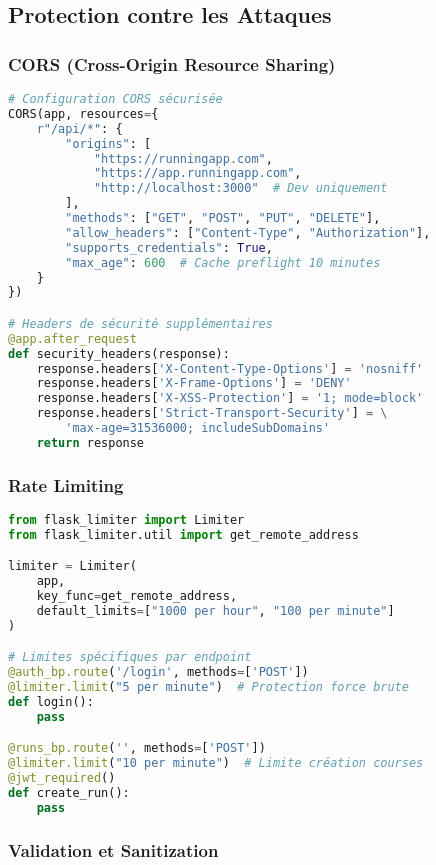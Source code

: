 \subsection{Protection contre les Attaques}

\subsubsection{CORS (Cross-Origin Resource Sharing)}

\begin{lstlisting}[language=python]
# Configuration CORS sécurisée
CORS(app, resources={
    r"/api/*": {
        "origins": [
            "https://runningapp.com",
            "https://app.runningapp.com",
            "http://localhost:3000"  # Dev uniquement
        ],
        "methods": ["GET", "POST", "PUT", "DELETE"],
        "allow_headers": ["Content-Type", "Authorization"],
        "supports_credentials": True,
        "max_age": 600  # Cache preflight 10 minutes
    }
})

# Headers de sécurité supplémentaires
@app.after_request
def security_headers(response):
    response.headers['X-Content-Type-Options'] = 'nosniff'
    response.headers['X-Frame-Options'] = 'DENY'
    response.headers['X-XSS-Protection'] = '1; mode=block'
    response.headers['Strict-Transport-Security'] = \
        'max-age=31536000; includeSubDomains'
    return response
\end{lstlisting}

\subsubsection{Rate Limiting}

\begin{lstlisting}[language=python]
from flask_limiter import Limiter
from flask_limiter.util import get_remote_address

limiter = Limiter(
    app,
    key_func=get_remote_address,
    default_limits=["1000 per hour", "100 per minute"]
)

# Limites spécifiques par endpoint
@auth_bp.route('/login', methods=['POST'])
@limiter.limit("5 per minute")  # Protection force brute
def login():
    pass

@runs_bp.route('', methods=['POST'])
@limiter.limit("10 per minute")  # Limite création courses
@jwt_required()
def create_run():
    pass
\end{lstlisting}

\subsubsection{Validation et Sanitization}

